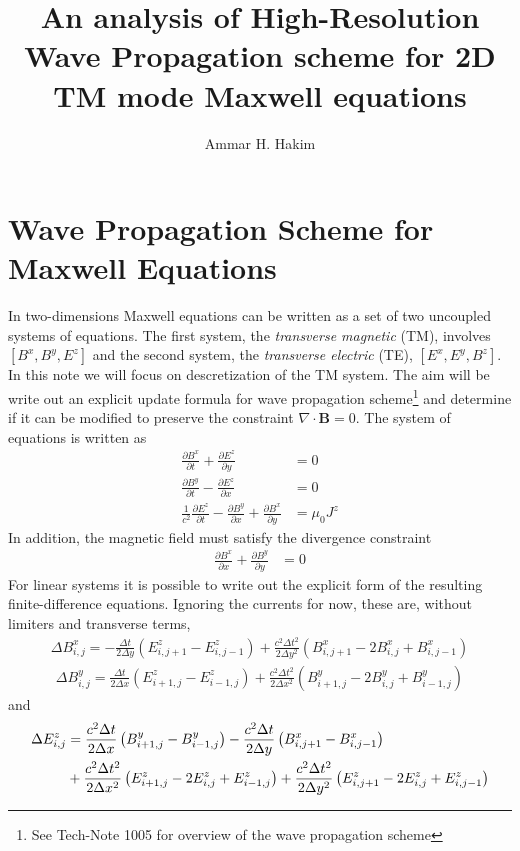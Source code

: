 \documentclass[11pt, reqno]{amsart}
\title{An analysis of High-Resolution Wave Propagation scheme for 2D
  TM mode Maxwell equations}%
\author{Ammar H. Hakim}%
\date{}
\newcommand{\pfrac}[2]{\frac{\partial #1}{\partial #2}}
\newcommand{\mvec}[1]{\mathbf{#1}}
\begin{document}
\maketitle

\section{Wave Propagation Scheme for Maxwell Equations}

In two-dimensions Maxwell equations can be written as a set of two
uncoupled systems of equations. The first system, the \emph{transverse
  magnetic} (TM), involves $[B^x, B^y, E^z]$ and the second system,
the \emph{transverse electric} (TE), $[E^x, E^y, B^z]$. In this note
we will focus on descretization of the TM system. The aim will be
write out an explicit update formula for wave propagation
scheme\footnote{See Tech-Note 1005 for overview of the wave
  propagation scheme} and determine if it can be modified to preserve
the constraint $\nabla \cdot \mvec{B} = 0$. The system of equations
is written as
\begin{align}
  \pfrac{B^x}{t} + \pfrac{E^z}{y} &= 0 \\
  \pfrac{B^y}{t} - \pfrac{E^z}{x} &= 0 \\
  \frac{1}{c^2}\pfrac{E^z}{t} - \pfrac{B^y}{x} + \pfrac{B^x}{y} &= \mu_0 J^z
\end{align}
In addition, the magnetic field must satisfy the divergence constraint
\begin{align}
  \pfrac{B^x}{x} + \pfrac{B^y}{y} &= 0
\end{align}
For linear systems it is possible to write out the explicit form of
the resulting finite-difference equations. Ignoring the currents for
now, these are, without limiters and transverse terms,
\begin{align}
  \Delta B^x_{i,j} = -\frac{\Delta t}{2\Delta y}
  \left(
    E^z_{i,j+1} - E^z_{i,j-1}
  \right)
  + \frac{c^2 \Delta t^2}{2\Delta y^2}
  \left(
    B^x_{i,j+1} - 2B^x_{i,j} + B^x_{i,j-1}
  \right)
\end{align}
\begin{align}
  \Delta B^y_{i,j} = \frac{\Delta t}{2\Delta x}
  \left(
    E^z_{i+1,j} - E^z_{i-1,j}
  \right)
  + \frac{c^2 \Delta t^2}{2\Delta x^2}
  \left(
    B^y_{i+1,j} - 2B^y_{i,j} + B^y_{i-1,j}
  \right)
\end{align}
and
\begin{align}
  \Delta E^z_{i,j} &= \frac{c^2 \Delta t}{2\Delta x}
  \left(
    B^y_{i+1,j} - B^y_{i-1,j}
  \right)
  -\frac{c^2 \Delta t}{2\Delta y}
  \left(
    B^x_{i,j+1} - B^x_{i,j-1}
  \right) \notag \\
  &+ \frac{c^2 \Delta t^2}{2\Delta x^2}
  \left(
    E^z_{i+1,j} - 2E^z_{i,j} + E^z_{i-1,j}
  \right)
  + \frac{c^2 \Delta t^2}{2\Delta y^2}
  \left(
    E^z_{i,j+1} - 2E^z_{i,j} + E^z_{i,j-1}
  \right)
\end{align}
\end{document}
